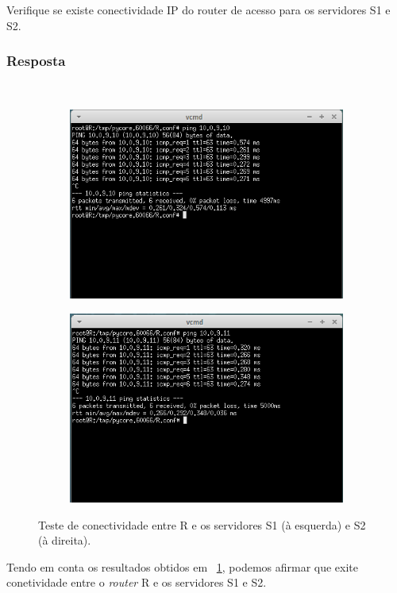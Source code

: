 \documentclass{llncs}
\begin{document}
Verifique se existe conectividade IP do router de acesso para os servidores S1 e S2.

\subsubsection{Resposta}\rule[-10pt]{0pt}{10pt}\\

\begin{figure}[h]
	\centering
	\begin{subfigure}{.5\textwidth}
		\centering
		\includegraphics[width=0.75\linewidth]{./imagens/R_S1.png}
	\end{subfigure}%
	\begin{subfigure}{.5\textwidth}
		\centering
		\includegraphics[width=0.75\linewidth]{./imagens/R_S2.png}
	\end{subfigure}
	\caption{Teste de conectividade entre R e os servidores S1 (à esquerda) e S2 (à direita).}
	\label{fig:r_s}
\end{figure}

Tendo em conta os resultados obtidos em ~\ref{fig:r_s}, podemos afirmar que exite conetividade entre o \textit{router} R e os servidores S1 e S2.
\end{document}
